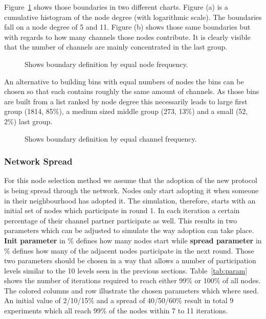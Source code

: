 \documentclass[final]{fhnwreport}       %
\begin{document}
Figure~\ref{fig:eqfreq} shows those boundaries in two different charts. Figure (a) is a cumulative histogram of the node degree (with logarithmic scale). The boundaries fall on a node degree of 5 and 11. Figure (b) shows those same boundaries but with regards to how many channels those nodes contribute. It is clearly visible that the number of channels are mainly concentrated in the last group. 



\begin{figure}[H]
\centering
{}\quad
{}
\caption{Shows boundary definition by equal node frequency.}
\label{fig:eqfreq}
\end{figure}

An alternative to building bins with equal numbers of nodes the bins can be chosen so that each contains roughly the same amount of channels. As those bins are built from a list ranked by node degree this necessarily leads to large first group (1814, 85\%), a medium sized middle group (273, 13\%) and a small (52, 2\%) last group. 

\begin{figure}[H]
\centering
{}\quad
{}
\caption{Shows boundary definition by equal channel frequency.}
\label{fig:eqfreqchannel}
\end{figure}
\subsubsection{Network Spread}
For this node selection method we assume that the adoption of the new protocol is being spread through the network. Nodes only start adopting it when someone in their neighbourhood has adopted it. The simulation, therefore, starts with an initial set of nodes which participate in round 1. In each iteration a certain percentage of their channel partner participate as well. This results in two parameters which can be adjusted to simulate the way adoption can take place. \textbf{Init parameter} in \% defines how many nodes start while \textbf{spread parameter} in \% defines how many of the adjacent nodes participate in the next round. Those two parameters should be chosen in a way that allows a number of participation levels similar to the 10 levels seen in the previous sections. Table~\ref{tab:param} shows the number of iterations required to reach either 99\% or 100\% of all nodes. The colored columns and row illustrate the chosen parameters which where used. An initial value of 2/10/15\% and a spread of 40/50/60\% result in total 9 experiments which all reach 99\% of the nodes within 7 to 11 iterations.
\end{document}

